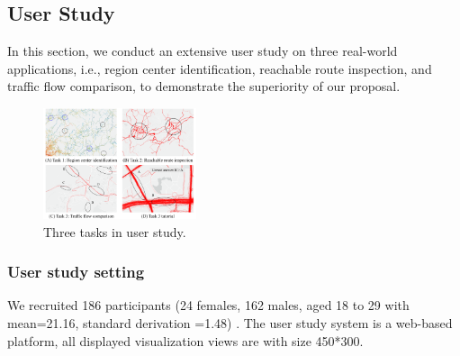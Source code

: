 \subsection{User Study}\label{sec:user}
In this section, we conduct an extensive user study on three real-world applications, i.e., region center identification, reachable route inspection, and traffic flow comparison, to demonstrate the superiority of our proposal.



\begin{figure}[t]
	\centering
	\includegraphics[width=0.40\textwidth]{pictures/user_study/interface.pdf}
	\vspace{-3mm}
	\caption{Three tasks in user study.}
	\label{fig:apps}
	\vspace{-6mm}
\end{figure}

\subsubsection{User study setting}\label{sec:uset}

We recruited 186 participants (24 females, 162 males, aged 18 to 29 with mean=21.16, standard derivation =1.48) .
The user study system is a web-based platform, all displayed visualization views are with size 450*300.


